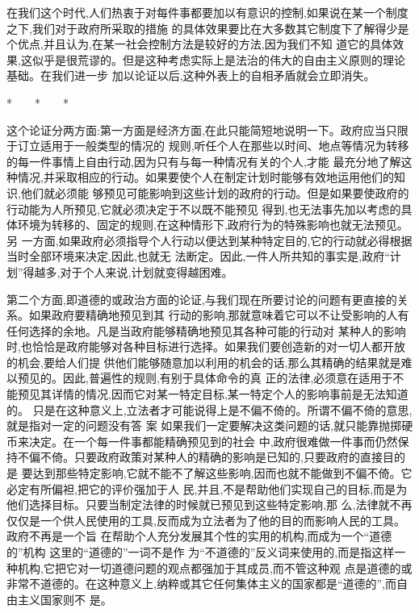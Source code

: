 ﻿\documentclass[12pt]{article}
\begin{document}
在我们这个时代,人们热衷于对每件事都要加以有意识的控制,如果说在某一个制度之下,我们对于政府所采取的措施
的具体效果要比在大多数其它制度下了解得少是个优点,并且认为,在某一社会控制方法是较好的方法,因为我们不知
道它的具体效果,这似乎是很荒谬的。但是这种考虑实际上是法治的伟大的自由主义原则的理论基础。在我们进一步
加以论证以后,这种外表上的自相矛盾就会立即消失。

*　　*　　*

这个论证分两方面:第一方面是经济方面,在此只能简短地说明一下。政府应当只限于订立适用于一般类型的情况的
规则,听任个人在那些以时间、地点等情况为转移的每一件事情上自由行动,因为只有与每一种情况有关的个人,才能
最充分地了解这种情况,并采取相应的行动。如果要使个人在制定计划时能够有效地运用他们的知识,他们就必须能
够预见可能影响到这些计划的政府的行动。但是如果要使政府的行动能为人所预见,它就必须决定于不以既不能预见
得到,也无法事先加以考虑的具体环境为转移的、固定的规则,在这种情形下,政府行为的特殊影响也就无法预见。另
一方面,如果政府必须指导个人行动以便达到某种特定目的,它的行动就必得根据当时全部环境来决定,因此,也就无
法断定。因此,一件人所共知的事实是,政府``计划''得越多,对于个人来说,计划就变得越困难。

第二个方面,即道德的或政治方面的论证,与我们现在所要讨论的问题有更直接的关系。如果政府要精确地预见到其
行动的影响,那就意味着它可以不让受影响的人有任何选择的余地。凡是当政府能够精确地预见其各种可能的行动对
某种人的影响时,也恰恰是政府能够对各种目标进行选择。如果我们要创造新的对一切人都开放的机会,要给人们提
供他们能够随意加以利用的机会的话,那么其精确的结果就是难以预见的。因此,普遍性的规则,有别于具体命令的真
正的法律,必须意在适用于不能预见其详情的情况,因而它对某一特定目标,某一特定个人的影响事前是无法知道的。
只是在这种意义上,立法者才可能说得上是不偏不倚的。所谓不偏不倚的意思,就是指对一定的问题没有答
案 \myrule 如果我们一定要解决这类问题的话,就只能靠抛掷硬币来决定。在一个每一件事都能精确预见到的社会
中,政府很难做一件事而仍然保持不偏不倚。只要政府政策对某种人的精确的影响是已知的,只要政府的直接目的是
要达到那些特定影响,它就不能不了解这些影响,因而也就不能做到不偏不倚。它必定有所偏袒,把它的评价强加于人
民,并且,不是帮助他们实现自己的目标,而是为他们选择目标。只要当制定法律的时候就已预见到这些特定影响,那
么,法律就不再仅仅是一个供人民使用的工具,反而成为立法者为了他的目的而影响人民的工具。政府不再是一个旨
在帮助个人充分发展其个性的实用的机构,而成为一个``道德的''机构 \myrule 这里的``道德的''一词不是作
为``不道德的''反义词来使用的,而是指这样一种机构,它把它对一切道德问题的观点都强加于其成员,而不管这种观
点是道德的或非常不道德的。在这种意义上,纳粹或其它任何集体主义的国家都是``道德的'',而自由主义国家则不
是。
\end{document}
